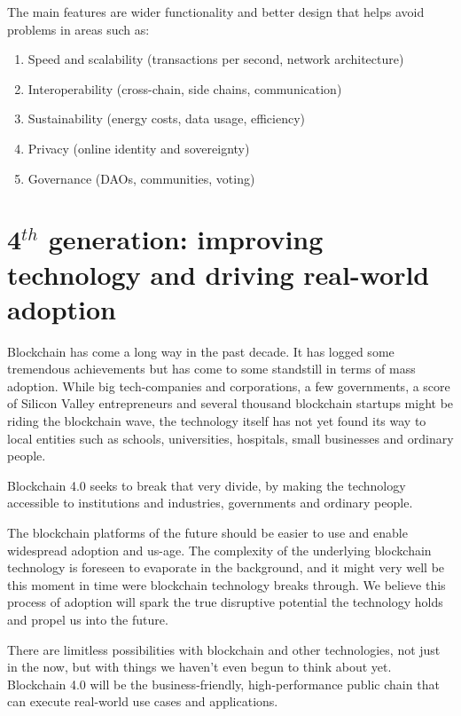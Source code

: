 The main features are wider functionality and better design that helps avoid problems in areas such as:

 \begin{enumerate}[label=(\alph*)]
 \setlength\itemsep{0em}
        \item Speed and scalability (transactions per second, network architecture)
        \item Interoperability (cross-chain, side chains, communication)
        \item Sustainability (energy costs, data usage, efficiency)
        \item Privacy (online identity and sovereignty)
        \item Governance (DAOs, communities, voting)
\end{enumerate}

\section{\texorpdfstring{4$^{th}$ generation: improving technology and driving real-world adoption}{4th generation: improving technology and driving real-world adoption}}
Blockchain has come a long way in the past decade. It has logged some tremendous achievements but has come to some standstill in terms of mass adoption. While big tech-companies and corporations, a few governments, a score of Silicon Valley entrepreneurs and several thousand blockchain startups might be riding the blockchain wave, the technology itself has not yet found its way to local entities such as schools, universities, hospitals, small businesses and ordinary people.

Blockchain 4.0 seeks to break that very divide, by making the technology accessible to institutions and industries, governments and ordinary people.

The blockchain platforms of the future should be easier to use and enable widespread adoption and us-age. The complexity of the underlying blockchain technology is foreseen to evaporate in the background, and it might very well be this moment in time were blockchain technology breaks through. We believe this process of adoption will spark the true disruptive potential the technology holds and propel us into the future. 

There are limitless possibilities with blockchain and other technologies, not just in the now, but with things we haven't even begun to think about yet. Blockchain 4.0 will be the business-friendly, high-performance public chain that can execute real-world use cases and applications.

